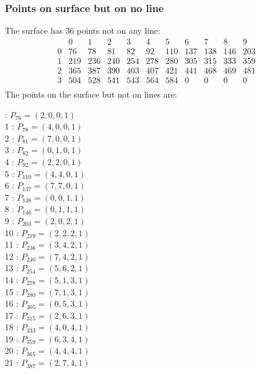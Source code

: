 \documentclass{article}
\begin{document}
{\subsubsection*{Points on surface but on no line}
The surface has 36 points not on any line:\\
$$
\begin{array}{r|*{10}{r}}
 & 0 & 1 & 2 & 3 & 4 & 5 & 6 & 7 & 8 & 9\\
\hline
0 & 76 & 78 & 81 & 82 & 92 & 110 & 137 & 138 & 146 & 203\\
1 & 219 & 236 & 240 & 254 & 278 & 280 & 305 & 315 & 333 & 359\\
2 & 365 & 387 & 390 & 403 & 407 & 421 & 441 & 468 & 469 & 481\\
3 & 504 & 528 & 541 & 543 & 564 & 584 & 0 & 0 & 0 & 0\\
\end{array}
$$
The points on the surface but not on lines are:\\
\begin{multicols}{2}
 : $P_{76}=( 2, 0, 0, 1 )$\\
1 : $P_{78}=( 4, 0, 0, 1 )$\\
2 : $P_{81}=( 7, 0, 0, 1 )$\\
3 : $P_{82}=( 0, 1, 0, 1 )$\\
4 : $P_{92}=( 2, 2, 0, 1 )$\\
5 : $P_{110}=( 4, 4, 0, 1 )$\\
6 : $P_{137}=( 7, 7, 0, 1 )$\\
7 : $P_{138}=( 0, 0, 1, 1 )$\\
8 : $P_{146}=( 0, 1, 1, 1 )$\\
9 : $P_{203}=( 2, 0, 2, 1 )$\\
10 : $P_{219}=( 2, 2, 2, 1 )$\\
11 : $P_{236}=( 3, 4, 2, 1 )$\\
12 : $P_{240}=( 7, 4, 2, 1 )$\\
13 : $P_{254}=( 5, 6, 2, 1 )$\\
14 : $P_{278}=( 5, 1, 3, 1 )$\\
15 : $P_{280}=( 7, 1, 3, 1 )$\\
16 : $P_{305}=( 0, 5, 3, 1 )$\\
17 : $P_{315}=( 2, 6, 3, 1 )$\\
18 : $P_{333}=( 4, 0, 4, 1 )$\\
19 : $P_{359}=( 6, 3, 4, 1 )$\\
20 : $P_{365}=( 4, 4, 4, 1 )$\\
21 : $P_{387}=( 2, 7, 4, 1 )$\\

\end{multicols}}
\end{document}
